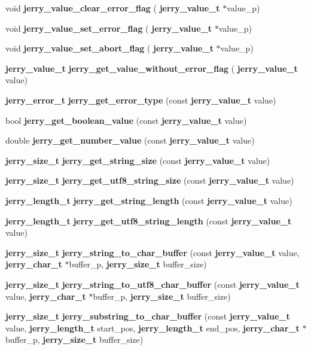\begin{DoxyCompactItemize}
\item 
void {\bfseries jerry\+\_\+value\+\_\+clear\+\_\+error\+\_\+flag} (\textbf{ jerry\+\_\+value\+\_\+t} $\ast$value\+\_\+p)
\item 
void {\bfseries jerry\+\_\+value\+\_\+set\+\_\+error\+\_\+flag} (\textbf{ jerry\+\_\+value\+\_\+t} $\ast$value\+\_\+p)
\item 
void {\bfseries jerry\+\_\+value\+\_\+set\+\_\+abort\+\_\+flag} (\textbf{ jerry\+\_\+value\+\_\+t} $\ast$value\+\_\+p)
\item 
\textbf{ jerry\+\_\+value\+\_\+t} {\bfseries jerry\+\_\+get\+\_\+value\+\_\+without\+\_\+error\+\_\+flag} (\textbf{ jerry\+\_\+value\+\_\+t} value)
\item 
\textbf{ jerry\+\_\+error\+\_\+t} \textbf{ jerry\+\_\+get\+\_\+error\+\_\+type} (const \textbf{ jerry\+\_\+value\+\_\+t} value)
\item 
bool \textbf{ jerry\+\_\+get\+\_\+boolean\+\_\+value} (const \textbf{ jerry\+\_\+value\+\_\+t} value)
\item 
double {\bfseries jerry\+\_\+get\+\_\+number\+\_\+value} (const \textbf{ jerry\+\_\+value\+\_\+t} value)
\item 
\textbf{ jerry\+\_\+size\+\_\+t} \textbf{ jerry\+\_\+get\+\_\+string\+\_\+size} (const \textbf{ jerry\+\_\+value\+\_\+t} value)
\item 
\textbf{ jerry\+\_\+size\+\_\+t} {\bfseries jerry\+\_\+get\+\_\+utf8\+\_\+string\+\_\+size} (const \textbf{ jerry\+\_\+value\+\_\+t} value)
\item 
\textbf{ jerry\+\_\+length\+\_\+t} {\bfseries jerry\+\_\+get\+\_\+string\+\_\+length} (const \textbf{ jerry\+\_\+value\+\_\+t} value)
\item 
\textbf{ jerry\+\_\+length\+\_\+t} {\bfseries jerry\+\_\+get\+\_\+utf8\+\_\+string\+\_\+length} (const \textbf{ jerry\+\_\+value\+\_\+t} value)
\item 
\textbf{ jerry\+\_\+size\+\_\+t} {\bfseries jerry\+\_\+string\+\_\+to\+\_\+char\+\_\+buffer} (const \textbf{ jerry\+\_\+value\+\_\+t} value, \textbf{ jerry\+\_\+char\+\_\+t} $\ast$buffer\+\_\+p, \textbf{ jerry\+\_\+size\+\_\+t} buffer\+\_\+size)
\item 
\textbf{ jerry\+\_\+size\+\_\+t} {\bfseries jerry\+\_\+string\+\_\+to\+\_\+utf8\+\_\+char\+\_\+buffer} (const \textbf{ jerry\+\_\+value\+\_\+t} value, \textbf{ jerry\+\_\+char\+\_\+t} $\ast$buffer\+\_\+p, \textbf{ jerry\+\_\+size\+\_\+t} buffer\+\_\+size)
\item 
\textbf{ jerry\+\_\+size\+\_\+t} {\bfseries jerry\+\_\+substring\+\_\+to\+\_\+char\+\_\+buffer} (const \textbf{ jerry\+\_\+value\+\_\+t} value, \textbf{ jerry\+\_\+length\+\_\+t} start\+\_\+pos, \textbf{ jerry\+\_\+length\+\_\+t} end\+\_\+pos, \textbf{ jerry\+\_\+char\+\_\+t} $\ast$buffer\+\_\+p, \textbf{ jerry\+\_\+size\+\_\+t} buffer\+\_\+size)

\end{DoxyCompactItemize}
